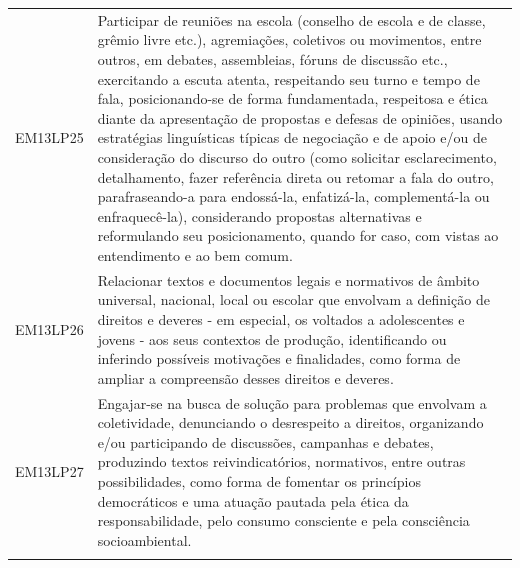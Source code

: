 \documentclass[12pt]{extarticle}
\begin{document}
\begin{longtable}{ll}
EM13LP25   & Participar de reuniões na escola (conselho de escola e de classe, grêmio livre etc.), agremiações, coletivos ou movimentos, entre outros, em debates, assembleias, fóruns de discussão etc., exercitando a escuta atenta, respeitando seu turno e tempo de fala, posicionando-se de forma fundamentada, respeitosa e ética diante da apresentação de propostas e defesas de opiniões, usando estratégias linguísticas típicas de negociação e de apoio e/ou de consideração do discurso do outro (como solicitar esclarecimento, detalhamento, fazer referência direta ou retomar a fala do outro, parafraseando-a para endossá-la, enfatizá-la, complementá-la ou enfraquecê-la), considerando propostas alternativas e reformulando seu posicionamento, quando for caso, com vistas ao entendimento e ao bem comum. \\
\rowcolor[HTML]{FFF} 
EM13LP26   & Relacionar textos e documentos legais e normativos de âmbito universal, nacional, local ou escolar que envolvam a definição de direitos e deveres - em especial, os voltados a adolescentes e jovens - aos seus contextos de produção, identificando ou inferindo possíveis motivações e finalidades, como forma de ampliar a compreensão desses direitos e deveres.                                                                                                                                                                                                                                                                                                                                                                                                                                                  \\
\rowcolor[HTML]{E0F7FA} 
EM13LP27   & Engajar-se na busca de solução para problemas que envolvam a coletividade, denunciando o desrespeito a direitos, organizando e/ou participando de discussões, campanhas e debates, produzindo textos reivindicatórios, normativos, entre outras possibilidades, como forma de fomentar os princípios democráticos e uma atuação pautada pela ética da responsabilidade, pelo consumo consciente e pela consciência socioambiental.                                                                                                                                                                                                                                                                                                                                                                                    \\
\rowcolor[HTML]{FFF} 

\end{longtable}
\end{document}
